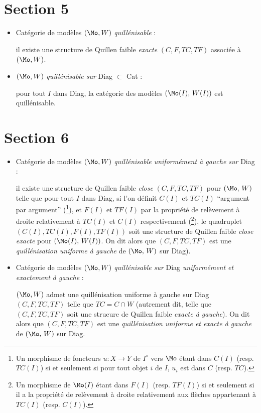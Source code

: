 \section*{Section 5}

\begin{itemize}
\item[\textbullet] Catégorie de modèles $(\Mo,W)$ \textit{quillénisable} :

il existe une structure de Quillen faible \textit{exacte} $(C,F,TC,TF)$ associée à $(\Mo,W)$.

\item[\textbullet] $(\Mo,W)$ \textit{quillénisable sur} Diag $\subset$ Cat :

pour tout $I$ dans Diag, la catégorie des modèles $(\Mo(I),\, W(I))$ est quillénisable.
\end{itemize}

\section*{Section 6}

\begin{itemize}
\item[\textbullet] Catégorie de modèles $(\Mo,W)$ \textit{quillénisable uniformément à gauche sur} Diag :

il existe une structure de Quillen faible \textit{close} $(C,F,TC,TF)$ pour $(\Mo,\, W)$ telle que pour tout $I$ dans Diag, si l'on définit $C(I)$ et $TC(I)$ “argument par argument” (\footnote{Un morphisme de foncteurs $u : X \longrightarrow Y$ de $I^{\circ}$ vers $\Mo$ étant dans $C(I)$ (resp. $TC(I)$) si et seulement si pour tout objet $i$ de $I$, $u_i$ est dans $C$ (resp. $TC$).}), et $F(I)$ et $TF(I)$ par la propriété de relèvement à droite relativement à $TC(I)$ et $C(I)$ respectivement (\footnote{Un morphisme de $\Mo(I)$ étant dans $F(I)$ (resp. $TF(I)$) si et seulement si il a la propriété de relèvement à droite relativement aux flèches appartenant à $TC(I)$ (resp. $C(I)$).}), le quadruplet $(C(I),TC(I),F(I),TF(I))$ soit une structure de Quillen faible \textit{close exacte} pour $(\Mo(I),\, W(I))$. On dit alors que $(C,F,TC,TF)$ est une \textit{quillénisation uniforme à gauche} de $(\Mo,\, W)$ sur Diag).
\end{itemize}


\begin{itemize}
\item[\textbullet] Catégorie de modèles $(\Mo,W)$ \textit{quillénisable sur} Diag \textit{uniformément et exactement à gauche} :

$(\Mo,W)$ admet une quillénisation uniforme à gauche sur Diag $(C,F,TC,TF)$ telle que $TC = C \cap W$ (autrement dit, telle que $(C,F,TC,TF)$ soit une strucure de Quillen faible \textit{exacte à gauche}). On dit alors que $(C,F,TC,TF)$ est une \textit{quillénisation uniforme et exacte à gauche} de $(\Mo,\, W)$ sur Diag. %
\end{itemize}

